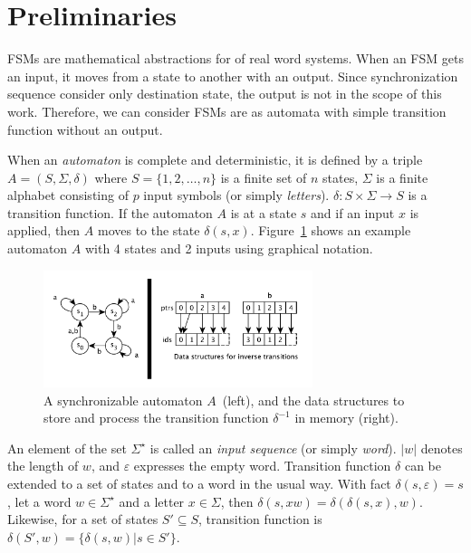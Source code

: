 \documentclass[12pt]{article}
\begin{document}
\clearpage
\section{Preliminaries}
\label{sec:Preliminaries}
FSMs are mathematical abstractions for of real word systems. When an FSM gets an input, it moves from a state to another with an output. Since synchronization sequence consider only destination state, the output is not in the scope of this work. Therefore, we can consider FSMs are as automata with simple transition function without an output.

When an {\em automaton} is complete and deterministic, it is defined by a triple $A=(S, \Sigma, \delta)$  where $S = \{1, 2, \ldots, n\}$ is a finite set of $n$ states, $\Sigma$ is a finite alphabet consisting of $p$ input symbols (or simply {\em letters}). $\delta : S \times \Sigma \rightarrow S$ is a transition function. If the automaton $A$ is at a state $s$ and if an input $x$ is applied, then $A$ moves to the state $\delta(s,x)$. Figure~\ref{fig:inv} shows an example automaton $A$ with 4 states and 2 inputs using graphical notation.

\begin{figure}[ht]
\centering
\includegraphics[width=0.7\textwidth]{figs/inverse.pdf}
\caption{A synchronizable automaton $A$~(left), and the data structures to store and process the transition function $\delta^{-1}$  in memory (right).}
\label{fig:inv}
\vspace*{-3ex}
\end{figure}

An element of the set $\Sigma^\star$ is called an {\em input sequence} (or simply {\em word}). $|w|$ denotes the length of $w$, and $\varepsilon$ expresses the empty word. Transition function $\delta$ can be extended to a set of states and to a word in the usual way. With fact $\delta(s,\varepsilon)=s$, let a word $w \in \Sigma^\star$ and a letter $x \in \Sigma$, then $\delta(s,xw) = \delta(\delta(s,x),w)$. Likewise, for a set of states $S' \subseteq S$, transition function is $\delta(S',w) = \{ \delta(s,w) | s \in S'\}$.
\end{document}
